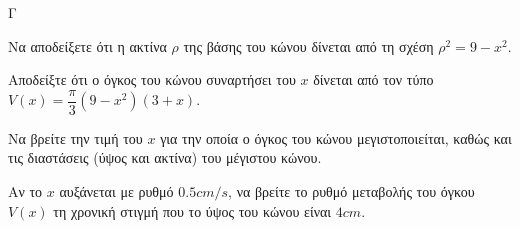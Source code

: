 \begin{thema}{Γ}
\begin{center}
\end{center}
\begin{erwthma}
  \item Να αποδείξετε ότι η ακτίνα $\rho$ της βάσης του κώνου δίνεται από τη σχέση $\rho^2 = 9 - x^2$.
  \item Αποδείξτε ότι ο όγκος του κώνου συναρτήσει του $x$ δίνεται από τον τύπο $V(x) = \dfrac{\pi}{3}(9-x^2)(3+x)$.
  \item Να βρείτε την τιμή του $x$ για την οποία ο όγκος του κώνου μεγιστοποιείται, καθώς και τις διαστάσεις (ύψος και ακτίνα) του μέγιστου κώνου.
  \item Αν το $x$ αυξάνεται με ρυθμό $0.5 \si{cm/s}$, να βρείτε το ρυθμό μεταβολής του όγκου $V(x)$ τη χρονική στιγμή που το ύψος του κώνου είναι $4\si{cm}$.
\end{erwthma}
\end{thema}
